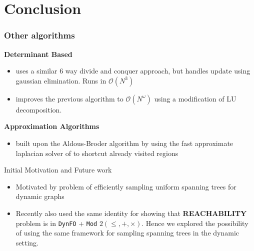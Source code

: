 \documentclass{beamer}
\begin{document}


\section{Conclusion}

\begin{frame}
 \frametitle{Other algorithms}
 
 \large\textbf{Determinant Based}
 \begin{itemize}
  \item \cite{COLBOURN1989271} uses a similar 6 way divide and conquer approach, but handles update using gaussian elimination. Runs in $\mathcal{O}(N^3)$
  \item \cite{COLBOURN1996268} improves the previous algorithm to $\mathcal{O}(N^\omega)$ using a modification of LU decomposition.
 \end{itemize}

 
 \large\textbf{Approximation Algorithms}
 \begin{itemize}
  \item \cite{10.5555/1747597.1748019} built upon the Aldous-Broder algorithm by using the fast approximate laplacian solver of \cite{10.1145/1007352.1007372} to shortcut already visited regions
 \end{itemize}

 
\end{frame}

\begin{frame}{Initial Motivation and Future work }
 
 \begin{itemize}
  \item Motivated by problem of efficiently sampling uniform spanning trees for dynamic graphs
 \item Recently \cite{DBLP:journals/corr/abs-2004-12739} also used the same identity for showing that \textbf{REACHABILITY} problem is in \texttt{DynFO} + \texttt{Mod} $2(\leq, +, \times)$. Hence we explored the possibility of using the same framework for sampling spanning trees in the dynamic setting.
 
 \end{itemize}


 
 
 
\end{frame}
\end{document}
